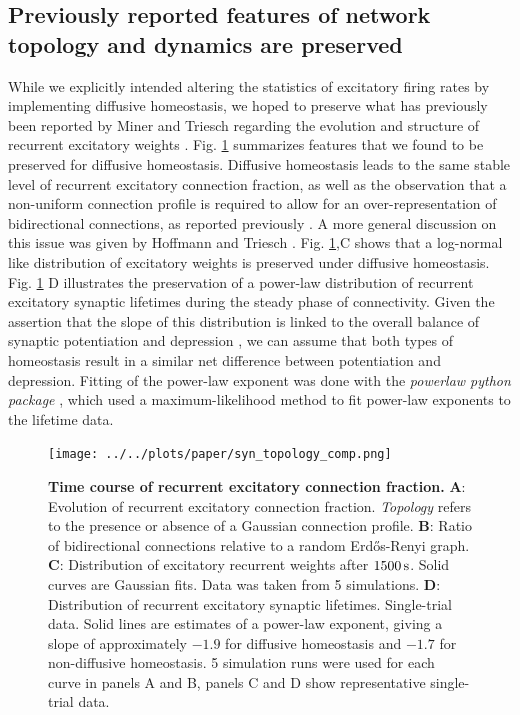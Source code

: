 \documentclass[10pt,letterpaper]{article}
\begin{document}
\subsection*{Previously reported features of network topology and dynamics are preserved}\label{Section_Topol_Preservation}
While we explicitly intended altering the statistics of excitatory firing rates by implementing diffusive homeostasis, we hoped to preserve what has previously been reported by Miner and Triesch regarding the evolution and structure of recurrent excitatory weights \cite{SORN_Paper}. Fig. \ref{Syn_Topology_Features} summarizes features that we found to be preserved for diffusive homeostasis. Diffusive homeostasis leads to the same stable level of recurrent excitatory connection fraction, as well as the observation that a non-uniform connection profile is required to allow for an over-representation of bidirectional connections, as reported previously \cite{SORN_Paper}. A more general discussion on this issue was given by Hoffmann and Triesch \cite{Hoffmann_2017}. Fig. \ref{Syn_Topology_Features},C shows that a log-normal like distribution of excitatory weights is preserved under diffusive homeostasis. Fig. \ref{Syn_Topology_Features} D illustrates the preservation of a power-law distribution of recurrent excitatory synaptic lifetimes during the steady phase of connectivity. Given the assertion that the slope of this distribution is linked to the overall balance of synaptic potentiation and depression \cite{SORN_Paper}, we can assume that both types of homeostasis result in a similar net difference between potentiation and depression. Fitting of the power-law exponent was done with the \textit{powerlaw python package} \cite{Powerlaw_Package}, which used a maximum-likelihood method to fit power-law exponents to the lifetime data.
\begin{figure}
\begin{center}
\texttt{[image: ../../plots/paper/syn\_topology\_comp.png]}
\end{center}
\caption{{\bf Time course of recurrent excitatory connection fraction.} \textbf{A}: Evolution of recurrent excitatory connection fraction. \textit{Topology} refers to the presence or absence of a Gaussian connection profile. \textbf{B}: Ratio of bidirectional connections relative to a random Erd\H{o}s-Renyi graph. \textbf{C}: Distribution of excitatory recurrent weights after $\rm 1500\, s$. Solid curves are Gaussian fits. Data was taken from 5 simulations. \textbf{D}: Distribution of recurrent excitatory synaptic lifetimes. Single-trial data. Solid lines are estimates of a power-law exponent, giving a slope of approximately $\mathrm{-1.9}$ for diffusive homeostasis and $\mathrm{-1.7}$ for non-diffusive homeostasis. 5 simulation runs were used for each curve in panels A and B, panels C and D show representative single-trial data.}
\label{Syn_Topology_Features}
\end{figure}
\end{document}
